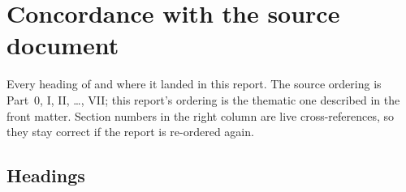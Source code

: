 \section{Concordance with the source document}
\label{app:concordance}

Every heading of  and where it landed in this report. The
source ordering is Part~0, I, II, \ldots, VII; this report's ordering is the
thematic one described in the front matter. Section numbers in the right column
are live cross-references, so they stay correct if the report is re-ordered
again.

\subsection{Headings}

